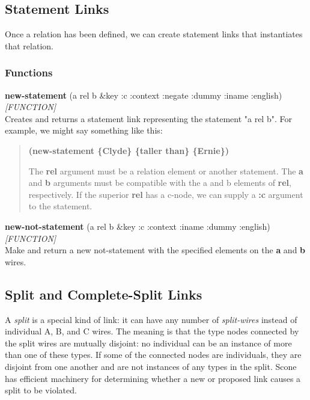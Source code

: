 \documentclass[titlepage,twoside,openright,11pt]{article}
\begin{document}
\subsection{Statement Links}\label{statement-links}

Once a relation has been defined, we can create statement links that
instantiates that relation.

\subsubsection{Functions}\label{functions-9}

\textbf{new-statement} (a rel b \&key :c :context :negate :dummy :iname
:english) \emph{{[}FUNCTION{]}}\\
Creates and returns a statement link representing the statement "a rel
b". For example, we might say something like this:

\begin{quote}
\textbf{(new-statement \{Clyde\} \{taller than\} \{Ernie\})}

The \textbf{rel} argument must be a relation element or another
statement. The \textbf{a} and \textbf{b} arguments must be compatible
with the a and b elements of \textbf{rel}, respectively. If the superior
\textbf{rel} has a c-node, we can supply a \textbf{:c} argument to the
statement.
\end{quote}

\textbf{new-not-statement} (a rel b \&key :c :context :iname :dummy
:english) \emph{{[}FUNCTION{]}}\\
Make and return a new not-statement with the specified elements on the
\textbf{a} and \textbf{b} wires.

\subsection{Split and Complete-Split
Links}\label{split-and-complete-split-links}

A \emph{split} is a special kind of link: it can have any number of
\emph{split-wires} instead of individual A, B, and C wires. The meaning
is that the type nodes connected by the split wires are mutually
disjoint: no individual can be an instance of more than one of these
types. If some of the connected nodes are individuals, they are disjoint
from one another and are not instances of any types in the split. Scone
has efficient machinery for determining whether a new or proposed link
causes a split to be violated.
\end{document}
